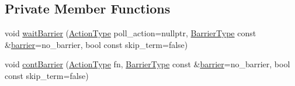 \subsection*{Private Member Functions}
\begin{DoxyCompactItemize}
\item 
void \hyperlink{structvt_1_1collective_1_1barrier_1_1_barrier_a014858c233344d9fd7e1ffc4050a1d8c}{wait\+Barrier} (\hyperlink{namespacevt_ae0a5a7b18cc99d7b732cb4d44f46b0f3}{Action\+Type} poll\+\_\+action=nullptr, \hyperlink{namespacevt_a25e481f0d6bbc7204db23d1c87a62e77}{Barrier\+Type} const \&\hyperlink{structvt_1_1collective_1_1barrier_1_1_barrier_a05124050c7d353a4f3475ee1875dd46a}{barrier}=no\+\_\+barrier, bool const skip\+\_\+term=false)
\item 
void \hyperlink{structvt_1_1collective_1_1barrier_1_1_barrier_aecec014f5db3d5b608ca553a91acc732}{cont\+Barrier} (\hyperlink{namespacevt_ae0a5a7b18cc99d7b732cb4d44f46b0f3}{Action\+Type} fn, \hyperlink{namespacevt_a25e481f0d6bbc7204db23d1c87a62e77}{Barrier\+Type} const \&\hyperlink{structvt_1_1collective_1_1barrier_1_1_barrier_a05124050c7d353a4f3475ee1875dd46a}{barrier}=no\+\_\+barrier, bool const skip\+\_\+term=false)
\end{DoxyCompactItemize}
